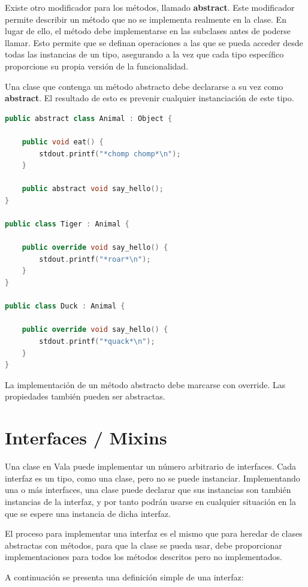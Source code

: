 \documentclass[12pt,twoside]{book}
\begin{document}
Existe otro modificador para los métodos, llamado \textbf{abstract}. Este modificador permite describir un método que no se implementa realmente en la clase. En lugar de ello, el método debe implementarse en las subclases antes de poderse llamar. Esto permite que se definan operaciones a las que se pueda acceder desde todas las instancias de un tipo, asegurando a la vez que cada tipo específico proporcione su propia versión de la funcionalidad.

Una clase que contenga un método abstracto debe declararse a su vez como \textbf{abstract}. El resultado de esto es prevenir cualquier instanciación de este tipo.

\begin{lstlisting}[language=C++]
public abstract class Animal : Object {
	
	public void eat() {
		stdout.printf("*chomp chomp*\n");
	}
	
	public abstract void say_hello();
}

public class Tiger : Animal {
	
	public override void say_hello() {
		stdout.printf("*roar*\n");
	}
}

public class Duck : Animal {
	
	public override void say_hello() {
		stdout.printf("*quack*\n");
	}
}
\end{lstlisting}


La implementación de un método abstracto debe marcarse con override. Las propiedades también pueden ser abstractas.


\section{Interfaces / Mixins}

Una clase en Vala puede implementar un número arbitrario de interfaces. Cada interfaz es un tipo, como una clase, pero no se puede instanciar. Implementando una o más interfaces, una clase puede declarar que sus instancias son también instancias de la interfaz, y por tanto podrán usarse en cualquier situación en la que se espere una instancia de dicha interfaz.

El proceso para implementar una interfaz es el mismo que para heredar de clases abstractas con métodos, para que la clase se pueda usar, debe proporcionar implementaciones para todos los métodos descritos pero no implementados.

A continuación se presenta una definición simple de una interfaz:
\end{document}
